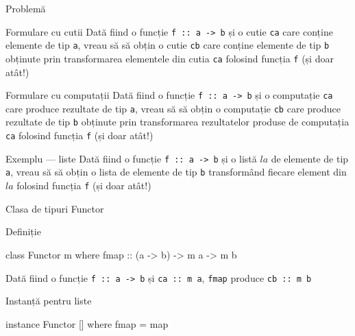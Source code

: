 \documentclass[xcolor=pdftex,romanian,colorlinks]{beamer}
\begin{document}
\begin{frame}[fragile]{Problemă}
\begin{block}{Formulare cu cutii}
Dată fiind o funcție \lstinline$f :: a -> b$ și o cutie \lstinline$ca$ care conține elemente de tip \lstinline$a$, vreau să să obțin o cutie \lstinline$cb$ care conține elemente de tip \lstinline$b$ obținute prin transformarea elementele din cutia \lstinline$ca$ folosind funcția \lstinline$f$ (și doar atât!)
\end{block}

\begin{block}{Formulare cu computații}
Dată fiind o funcție \lstinline$f :: a -> b$ și o computație \lstinline$ca$ care produce rezultate de tip \lstinline$a$, vreau să să obțin o computație \lstinline$cb$ care produce rezultate de tip \lstinline$b$ obținute prin transformarea rezultatelor produse de computația \lstinline$ca$ folosind funcția \lstinline$f$ (și doar atât!)
\end{block}

\begin{block}{Exemplu --- liste}
Dată fiind o funcție \lstinline$f :: a -> b$ și o listă $la$ de elemente de tip \lstinline$a$, vreau să să obțin o lista  de elemente de tip \lstinline$b$ transformând fiecare element din $la$ folosind funcția \lstinline$f$ (și doar atât!)
\end{block}

\end{frame}

\begin{frame}[fragile]{Clasa de tipuri Functor}
\begin{block}{Definiție}
\begin{asciihs}
class Functor m where
  fmap :: (a -> b) -> m a -> m b
\end{asciihs}

Dată fiind o funcție \lstinline$f :: a -> b$ și \lstinline$ca :: m a$, \lstinline$fmap$ produce \lstinline$cb :: m b$ \color{gray}{obținută prin transformarea rezultatelor produse de computația \lstinline$ca$ folosind funcția \lstinline$f$ (și doar atât!)}

\end{block}
\vfill
\begin{block}{Instanță pentru liste}
\begin{asciihs}
instance Functor [] where
  fmap = map
\end{asciihs}
\end{block}
\end{frame}
\end{document}

